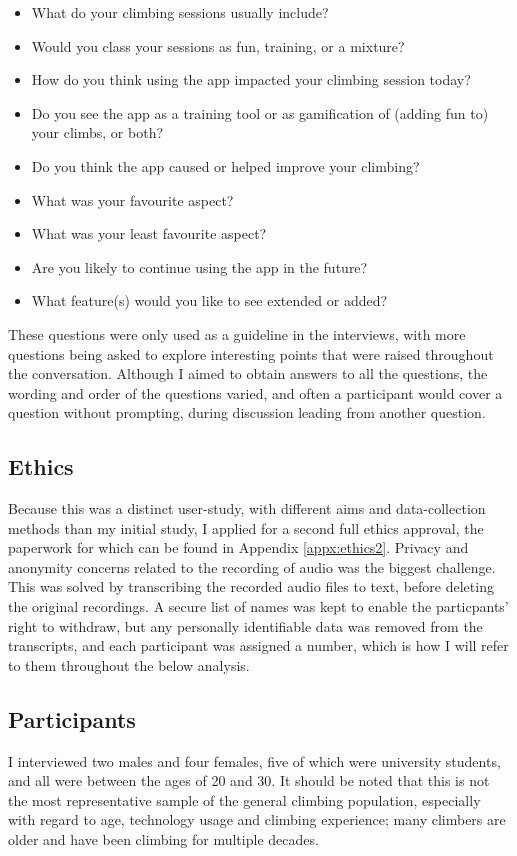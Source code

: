 \begin{itemize}
    \item What do your climbing sessions usually include?
    \item Would you class your sessions as fun, training, or a mixture?
    \item How do you think using the app impacted your climbing session today?
    \item Do you see the app as a training tool or as gamification of (adding fun to) your climbs, or both?
    \item Do you think the app caused or helped improve your climbing?
    \item What was your favourite aspect?
    \item What was your least favourite aspect?
    \item Are you likely to continue using the app in the future?
    \item What feature(s) would you like to see extended or added?
\end{itemize}

These questions were only used as a guideline in the interviews, with more questions being asked to explore interesting points that were raised  throughout the conversation.
Although I aimed to obtain answers to all the questions, the wording and order of the questions varied, and often a participant would cover a question without prompting, during discussion leading from another question.


\subsection{Ethics}
Because this was a distinct user-study, with different aims and data-collection methods than my initial study, I applied for a second full ethics approval, the paperwork for which can be found in Appendix \ref{appx:ethics2}.
Privacy and anonymity concerns related to the recording of audio was the biggest challenge.
This was solved by transcribing the recorded audio files to text, before deleting the original recordings.
A secure list of names was kept to enable the particpants' right to withdraw, but any personally identifiable data was removed from the transcripts, and each participant was assigned a number, which is how I will refer to them throughout the below analysis.

\subsection{Participants}
I interviewed two males and four females, five of which were university students, and all were between the ages of 20 and 30.
It should be noted that this is not the most representative sample of the general climbing population, especially with regard to age, technology usage and climbing experience; many climbers are older and have been climbing for multiple decades.

